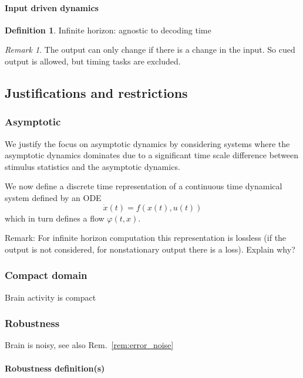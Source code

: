 \documentclass{scrartcl}
\theoremstyle{definition}
\newtheorem{definition}{Definition}
\theoremstyle{remark}
\newtheorem{remark}{Remark}
\begin{document}
\paragraph{Input driven dynamics}


\begin{definition}
Infinite horizon: agnostic to decoding time
\end{definition}

\begin{remark}
The output can only change if there is a change in the input. 
So cued output is allowed, but timing tasks are excluded.
\end{remark}

\subsection{Justifications and restrictions}\label{sec:jar}
\subsubsection{Asymptotic}
We justify the focus on asymptotic dynamics by considering systems where the asymptotic dynamics dominates due to a significant time scale difference between stimulus statistics and the asymptotic dynamics.


We now define a discrete time representation of a continuous time dynamical system defined by an ODE
\begin{equation}
\dot x(t) = f(x(t), u(t))
\end{equation}
which in turn defines a flow $\varphi(t,x)$.

Remark: For infinite horizon computation this representation is lossless (if the output is not considered, for nonstationary output there is a loss).
Explain why?




\subsubsection{Compact domain}
Brain activity is compact

\subsubsection{Robustness}
Brain is noisy, see also Rem.~\ref{rem:error_noise}

\paragraph{Robustness definition(s)}
\end{document}
